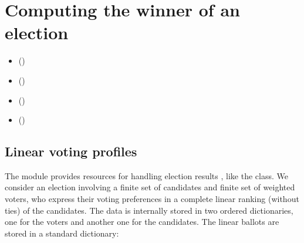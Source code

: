 \documentclass[a4paper,10pt,english]{sphinxhowto}
\begin{document}
\section{Computing the winner of an election}
\label{\detokenize{tutorial:computing-the-winner-of-an-election}}\label{\detokenize{tutorial:linearvoting-tutorial-label}}
\begin{sphinxShadowBox}
\begin{itemize}
\item {} 
\label{\detokenize{tutorial:id180}}{\hyperref[\detokenize{tutorial:linear-voting-profiles}]{}} ()

\item {} 
\label{\detokenize{tutorial:id181}}{\hyperref[\detokenize{tutorial:computing-the-winner}]{}} ()

\item {} 
\label{\detokenize{tutorial:id182}}{\hyperref[\detokenize{tutorial:the-condorcet-winner}]{}} ()

\item {} 
\label{\detokenize{tutorial:id183}}{\hyperref[\detokenize{tutorial:cyclic-social-preferences}]{}} ()

\end{itemize}
\end{sphinxShadowBox}


\subsection{Linear voting profiles}
\label{\detokenize{tutorial:linear-voting-profiles}}
The  module provides resources for handling election results , like the  class. We consider an election involving a finite set of candidates and finite set of weighted voters, who express their voting preferences in a complete linear ranking (without ties) of the candidates. The data is internally stored in two ordered dictionaries, one for the voters and another one for the candidates. The linear ballots are stored in a standard dictionary:
\end{document}
